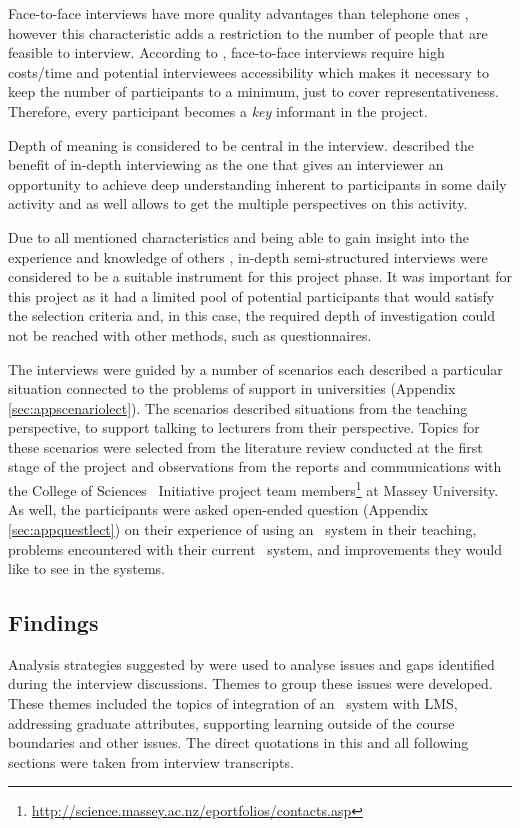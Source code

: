 Face-to-face interviews have more quality advantages than telephone ones
\citep{Shuy2001}, however this characteristic adds a restriction to the number
of people that are feasible to interview. According to \citet{Gillham2000},
face-to-face interviews require high costs/time and potential interviewees
accessibility which makes it necessary to keep the number of participants to a
minimum, just to cover representativeness. Therefore, every participant becomes
a \textit{key} informant in the project.

Depth of meaning is considered to be central in the interview.
\citet{Johnson2001} described the benefit of in-depth interviewing as the one
that gives an interviewer an opportunity to achieve deep understanding inherent
to participants in some daily activity and as well allows to get the multiple
perspectives on this activity.

Due to all mentioned characteristics and being able to gain insight into the
experience and knowledge of others \citep{Schostak2006}, in-depth
semi-structured interviews were considered to be a suitable instrument for this
project phase. It was important for this project as it had a limited pool of 
potential participants that would satisfy the selection criteria and, in this
case, the required depth of investigation could not be reached with other
methods, such as questionnaires.

The interviews were guided by a number of scenarios each described a particular
situation connected to the problems of \LLLs support in universities (Appendix
\ref{sec:appscenariolect}). The scenarios described situations from the teaching
perspective, to support talking to lecturers from their perspective. Topics for
these scenarios were selected from the literature review conducted at the first
stage of the project and observations from the reports and communications with
the College of Sciences \ep~Initiative project team
members\footnote{\url{http://science.massey.ac.nz/eportfolios/contacts.asp}} at
Massey University. As well, the participants were asked open-ended question
(Appendix \ref{sec:appquestlect}) on their experience of using an \ep~system in
their teaching, problems encountered with their current \ep~system, and
improvements they would like to see in the systems.

\subsection{Findings}

Analysis strategies suggested by \citet{Marshall2010} were used to analyse
issues and gaps identified during the interview discussions. Themes to group
these issues were developed. These themes included the topics of integration of
an \ep~system with LMS, addressing graduate attributes, supporting learning
outside of the course boundaries and other issues. The direct quotations in this
and all following sections were taken from interview transcripts.

